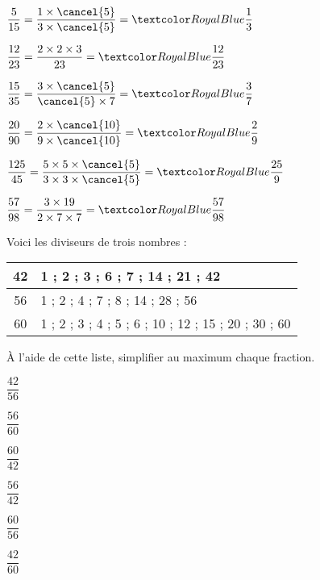 \begin{Maquette}[Fiche,CorrigeFin,Colonnes=2]{}
\begin{multicols}{2}
      \begin{Solution}
         \begin{colenumerate}
            \item $\dfrac{5}{15} =\dfrac{1\times\cancel{5}}{3\times\cancel{5}} =\cor{\dfrac13}$ \medskip
            \item $\dfrac{12}{23} =\dfrac{2\times2\times3}{23} =\cor{\dfrac{12}{23}}$ \medskip
            \item $\dfrac{15}{35} =\dfrac{3\times\cancel{5}}{\cancel{5}\times7} =\cor{\dfrac37}$ \medskip
            \item $\dfrac{20}{90} =\dfrac{2\times\cancel{10}}{9\times\cancel{10}} =\cor{\dfrac29}$ \medskip
            \item $\dfrac{125}{45} =\dfrac{5\times5\times\cancel{5}}{3\times3\times\cancel{5}} =\cor{\dfrac{25}{9}}$ \medskip
            \item $\dfrac{57}{98} =\dfrac{3\times19}{2\times7\times7} =\cor{\dfrac{57}{98}}$
         \end{colenumerate}
      \end{Solution}


      \begin{exercice} %
         Voici les diviseurs de trois nombres :
         \begin{center}
            {
            \begin{tabular}{|c|p{5.5cm}|}
               \hline
               42 & 1 ; 2 ; 3 ; 6 ; 7 ; 14 ; 21 ; 42 \\
               \hline
               56 & 1 ; 2 ; 4 ; 7 ; 8 ; 14 ; 28 ; 56 \\
               \hline
               60 & 1 ; 2 ; 3 ; 4 ; 5 ; 6 ; 10 ; 12 ; 15 ; 20 ; 30 ; 60 \\
               \hline
            \end{tabular}}
         \end{center}
         À l'aide de cette liste, simplifier au maximum chaque fraction. \smallskip
         \begin{colenumerate}[3]
            \item $\dfrac{42}{56}$ \medskip
            \item $\dfrac{56}{60}$ \medskip
            \item $\dfrac{60}{42}$
            \item $\dfrac{56}{42}$  
            \item $\dfrac{60}{56}$
            \item $\dfrac{42}{60}$
         \end{colenumerate}
      \end{exercice}


\end{multicols}
\end{Maquette}
